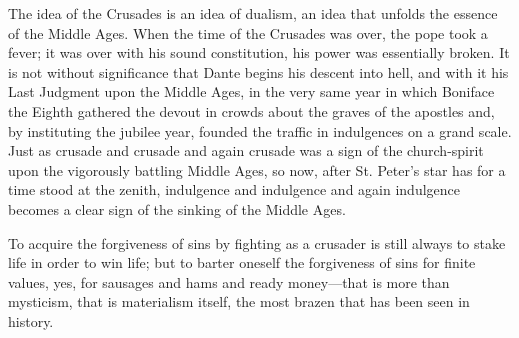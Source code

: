 \documentclass[12pt]{book}
\begin{document}
The idea of the Crusades is an idea of dualism, an idea that unfolds the
essence of the Middle Ages. When the time of the Crusades was over, the
pope took a fever; it was over with his sound constitution, his power
was essentially broken. It is not without significance that Dante begins
his descent into hell, and with it his Last Judgment upon the Middle
Ages, in the very same year in which Boniface the Eighth gathered the
devout in crowds about the graves of the apostles and, by instituting the
jubilee year, founded the traffic in indulgences on a grand scale. Just
as crusade and crusade and again crusade was a sign of the church-spirit
upon the vigorously battling Middle Ages, so now, after St. Peter's star
has for a time stood at the zenith, indulgence and indulgence and again
indulgence becomes a clear sign of the sinking of the Middle Ages.

To acquire the forgiveness of sins by fighting as a crusader is still
always to stake life in order to win life; but to barter oneself the
forgiveness of sins for finite values, yes, for sausages and hams and
ready money---that is more than mysticism, that is materialism itself,
the most brazen that has been seen in history.
\end{document}
